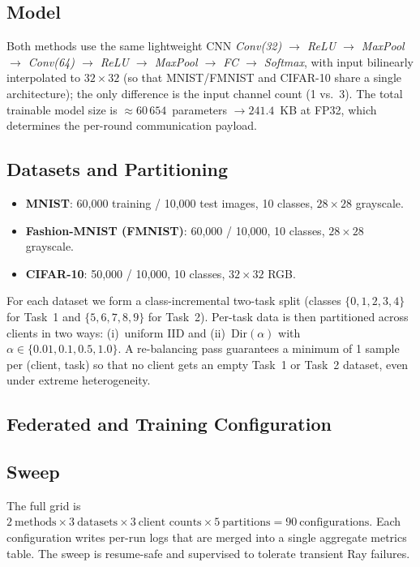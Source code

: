 \documentclass[journal]{IEEEtran}
\begin{document}
\subsection{Model}

Both methods use the same lightweight CNN
\textit{Conv(32) $\to$ ReLU $\to$ MaxPool $\to$ Conv(64) $\to$ ReLU
$\to$ MaxPool $\to$ FC $\to$ Softmax}, with input bilinearly
interpolated to $32{\times}32$ (so that MNIST/FMNIST and CIFAR-10
share a single architecture); the only difference is the input channel
count (1 vs.\ 3). The total trainable model size is $\approx
60\,654$~parameters $\to 241.4$~KB at FP32, which determines the
per-round communication payload.

\subsection{Datasets and Partitioning}

\begin{itemize}
    \item \textbf{MNIST}: 60{,}000 training / 10{,}000 test images,
        10 classes, $28{\times}28$ grayscale.
    \item \textbf{Fashion-MNIST (FMNIST)}: 60{,}000 / 10{,}000,
        10 classes, $28{\times}28$ grayscale.
    \item \textbf{CIFAR-10}: 50{,}000 / 10{,}000, 10 classes,
        $32{\times}32$ RGB.
\end{itemize}

For each dataset we form a class-incremental two-task split
(classes $\{0,1,2,3,4\}$ for Task~1 and $\{5,6,7,8,9\}$ for Task~2).
Per-task data is then partitioned across clients in two ways:
(i)~uniform IID and (ii)~$\mathrm{Dir}(\alpha)$ with
$\alpha\in\{0.01,0.1,0.5,1.0\}$.
A re-balancing pass guarantees a minimum of 1 sample per (client,
task) so that no client gets an empty Task~1 or Task~2 dataset, even
under extreme heterogeneity.

\subsection{Federated and Training Configuration}



\subsection{Sweep}

The full grid is $2~\textrm{methods} \times 3~\textrm{datasets}
\times 3~\textrm{client counts} \times 5~\textrm{partitions} =
90~\textrm{configurations}$. Each configuration writes per-run logs that are merged into a single
aggregate metrics table. The sweep is resume-safe and supervised to
tolerate transient Ray failures.
\end{document}
